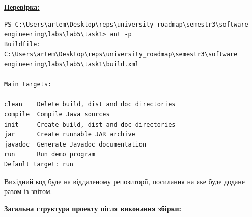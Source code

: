\documentclass[12pt,a4paper]{article}
\begin{document}
    \textbf{\underline{Перевірка:}}

    \begin{verbatim}
PS C:\Users\artem\Desktop\reps\university_roadmap\semestr3\software engineering\labs\lab5\task1> ant -p 
Buildfile: C:\Users\artem\Desktop\reps\university_roadmap\semestr3\software engineering\labs\lab5\task1\build.xml

Main targets:

clean    Delete build, dist and doc directories
compile  Compile Java sources
init     Create build, dist and doc directories
jar      Create runnable JAR archive
javadoc  Generate Javadoc documentation
run      Run demo program
Default target: run
    \end{verbatim}

    Вихідний код буде на віддаленому репозиторії, посилання на яке буде додане разом із звітом.

    \textbf{\underline{Загальна структура проекту після виконання збірки:}}
\end{document}
